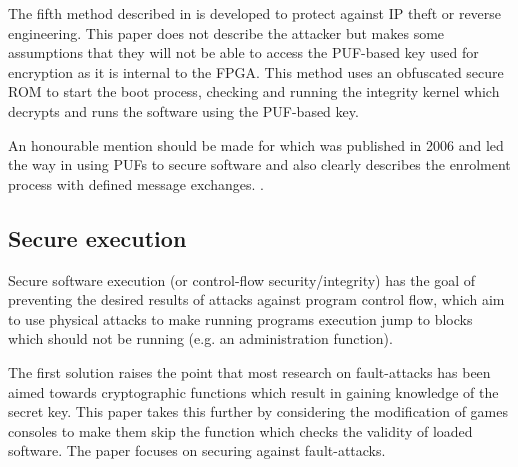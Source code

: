 The fifth method described in \cite{Gora2010} is developed to protect against IP theft or reverse engineering. This paper does not describe the attacker but makes some assumptions that they will not be able to access the PUF-based key used for encryption as it is internal to the FPGA. This method uses an obfuscated secure ROM to start the boot process, checking and running the integrity kernel which decrypts and runs the software using the PUF-based key. 


An honourable mention should be made for \cite{Simpson2006} which was published in 2006 and led the way in using PUFs to secure software and also clearly describes the enrolment process with defined message exchanges. .


\subsection{Secure execution}

Secure software execution (or control-flow security/integrity) has the goal of preventing the desired results of attacks against program control flow, which aim to use physical attacks to make running programs execution jump to blocks which should not be running (e.g. an administration function).

The first solution \cite{Werner2016} raises the point that most research on fault-attacks has been aimed towards cryptographic functions which result in gaining knowledge of the secret key. This paper takes this further by considering the modification of games consoles to make them skip the function which checks the validity of loaded software. The paper focuses on securing against fault-attacks.


